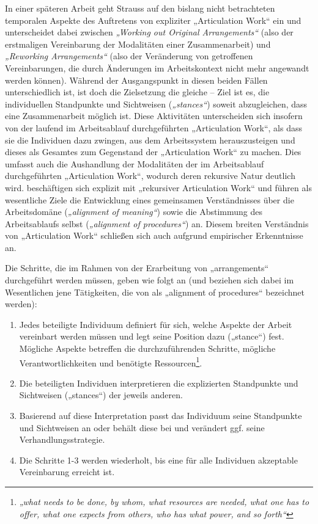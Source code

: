 In einer späteren Arbeit geht Strauss auf den bislang nicht betrachteten temporalen Aspekte des Auftretens von expliziter „Articulation Work“ ein \citep{Corbin93} und unterscheidet dabei zwischen \emph{„Working out Original Arrangements“} (also der erstmaligen Vereinbarung der Modalitäten einer Zusammenarbeit) und \emph{„Reworking Arrangements“} (also der Veränderung von getroffenen Vereinbarungen, die durch Änderungen im Arbeitskontext nicht mehr angewandt werden können). Während der Ausgangspunkt in diesen beiden Fällen unterschiedlich ist, ist doch die Zielsetzung die gleiche -- Ziel ist es, die individuellen Standpunkte und Sichtweisen (\emph{„stances“}) soweit abzugleichen, dass eine Zusammenarbeit möglich ist. Diese Aktivitäten unterscheiden sich insofern von der laufend im Arbeitsablauf durchgeführten „Articulation Work“, als dass sie die Individuen dazu zwingen, aus dem Arbeitssystem herauszusteigen und dieses als Gesamtes zum Gegenstand der „Articulation Work“ zu machen. Dies umfasst auch die Aushandlung der Modalitäten der im Arbeitsablauf durchgeführten „Articulation Work“, wodurch deren rekursive Natur \citep{Star99} deutlich wird. \citet{Sarini02} beschäftigen sich explizit mit „rekursiver Articulation Work“ und führen als wesentliche Ziele die Entwicklung eines gemeinsamen Verständnisses über die Arbeitsdomäne (\emph{„alignment of meaning“}) sowie die Abstimmung des Arbeitsablaufs selbst (\emph{„alignment of procedures“}) an. Diesem breiten Verständnis von „Articulation Work“ schließen sich auch \citet{Baker07} aufgrund empirischer Erkenntnisse an.

\label{steps:corbin} Die Schritte, die im Rahmen von der Erarbeitung von „arrangements“ durchgeführt werden müssen, geben \citet{Corbin93} wie folgt an (und beziehen sich dabei im Wesentlichen jene Tätigkeiten, die von \citet{Sarini02} als „alignment of procedures“ bezeichnet werden):
\begin{enumerate}
	\item Jedes beteiligte Individuum definiert für sich, welche Aspekte der Arbeit vereinbart werden müssen und legt seine Position dazu („stance“) fest. Mögliche Aspekte betreffen die durchzuführenden Schritte, mögliche Verantwortlichkeiten und benötigte Ressourcen\footnote{\emph{„what needs to be done, by whom, what resources are needed, what one has to offer, what one expects from others, who has what power, and so forth“}\citep[][S. 76]{Corbin93}}. 
	\item Die beteiligten Individuen interpretieren die explizierten Standpunkte und Sichtweisen („stances“) der jeweils anderen. 
	\item Basierend auf diese Interpretation passt das Individuum seine Standpunkte und Sichtweisen an oder behält diese bei und verändert ggf. seine Verhandlungsstrategie.
	\item Die Schritte 1-3 werden wiederholt, bis eine für alle Individuen akzeptable Vereinbarung erreicht ist.
\end{enumerate}

